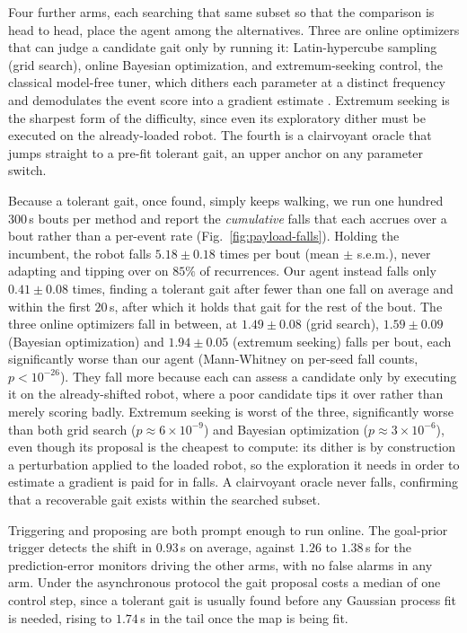 \documentclass[letterpaper, 10 pt, conference]{ieeeconf}  %
\begin{document}
Four further arms, each searching that same subset so that the comparison is head to head, place the agent among the alternatives.
Three are online optimizers that can judge a candidate gait only by running it: Latin-hypercube sampling (grid search), online Bayesian optimization, and extremum-seeking control, the classical model-free tuner, which dithers each parameter at a distinct frequency and demodulates the event score into a gradient estimate \cite{killingsworth2006extremum}.
Extremum seeking is the sharpest form of the difficulty, since even its exploratory dither must be executed on the already-loaded robot.
The fourth is a clairvoyant oracle that jumps straight to a pre-fit tolerant gait, an upper anchor on any parameter switch.

Because a tolerant gait, once found, simply keeps walking, we run one hundred $300$\,s bouts per method and report the \emph{cumulative} falls that each accrues over a bout rather than a per-event rate (Fig.~\ref{fig:payload-falls}).
Holding the incumbent, the robot falls $5.18 \pm 0.18$ times per bout (mean $\pm$ s.e.m.), never adapting and tipping over on $85\%$ of recurrences.
Our agent instead falls only $0.41 \pm 0.08$ times, finding a tolerant gait after fewer than one fall on average and within the first $20$\,s, after which it holds that gait for the rest of the bout.
The three online optimizers fall in between, at $1.49 \pm 0.08$ (grid search), $1.59 \pm 0.09$ (Bayesian optimization) and $1.94 \pm 0.05$ (extremum seeking) falls per bout, each significantly worse than our agent (Mann-Whitney on per-seed fall counts, $p < 10^{-26}$).
They fall more because each can assess a candidate only by executing it on the already-shifted robot, where a poor candidate tips it over rather than merely scoring badly.
Extremum seeking is worst of the three, significantly worse than both grid search ($p \approx 6 \times 10^{-9}$) and Bayesian optimization ($p \approx 3 \times 10^{-6}$), even though its proposal is the cheapest to compute: its dither is by construction a perturbation applied to the loaded robot, so the exploration it needs in order to estimate a gradient is paid for in falls.
A clairvoyant oracle never falls, confirming that a recoverable gait exists within the searched subset.

Triggering and proposing are both prompt enough to run online.
The goal-prior trigger detects the shift in $0.93$\,s on average, against $1.26$ to $1.38$\,s for the prediction-error monitors driving the other arms, with no false alarms in any arm.
Under the asynchronous protocol the gait proposal costs a median of one control step, since a tolerant gait is usually found before any Gaussian process fit is needed, rising to $1.74$\,s in the tail once the map is being fit.
\end{document}
